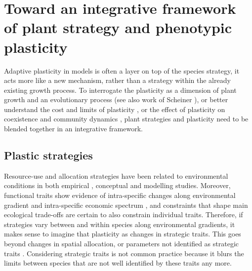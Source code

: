 \section{Toward an integrative framework of plant strategy and phenotypic plasticity}

Adaptive plasticity in models is often a layer on top of the species strategy, it acts more like a new mechanism, rather than a strategy within the already existing growth process. To interrogate the plasticity as a dimension of plant growth and an evolutionary process \parencite{bradshaw_evolutionary_1965} (see also work of Scheiner \parencite{scheiner_genetics_1989, scheiner_genetics_2002, scheiner_genetics_2012}), or better understand the cost and limits of plasticity \parencite{dewitt_costs_1998, callahan_phenotypic_2008, auld_re-evaluating_2009}, or the effect of plasticity on coexistence and community dynamics \parencite{hart_how_2016}, plant strategies and plasticity need to be blended together in an integrative framework.

\subsection{Plastic strategies}

Resource-use and allocation strategies have been related to environmental conditions in both empirical \parencite{wright_leaves_2002, ackerly_functional_2004, poorter_leaf_2006}, conceptual \parencite{grime_evidence_1977, westoby_leaf-height-seed_1998} and modelling\parencite{kleidon_global_2000, scheiter_impacts_2009, reineking_environmental_2006} studies. Moreover, functional traits show evidence of intra-specific changes along environmental gradient \parencite{kichenin_contrasting_2013} and intra-specific economic spectrum \parencite{hu_novel_2015}, and constraints that shape main ecological trade-offs are certain to also constrain individual traits. Therefore, if strategies vary between and within species along environmental gradients, it makes sense to imagine that plasticity as changes in strategic traits. This goes beyond changes in spatial allocation\parencite{schapendonk_lingra_1998}, or parameters not identified as strategic traits \parencite{lohier_explaining_2014, feller_mathematical_2015}. Considering strategic traits is not common practice because it blurs the limits between species that are not well identified by these traits any more.

